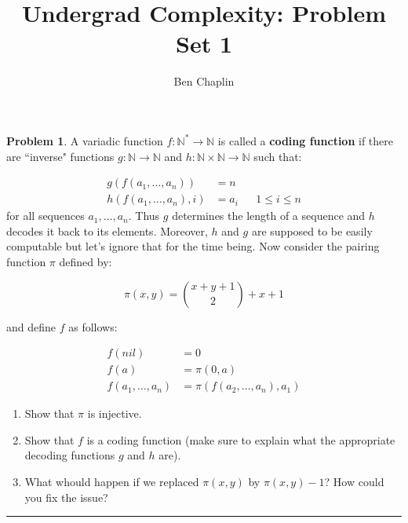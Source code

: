 \documentclass[11pt]{article}
\title{Undergrad Complexity: Problem Set 1}
\author{Ben Chaplin}
\date{}
\theoremstyle{plain}
\theoremstyle{definition}
\newtheorem{prob}{Problem}
\newcommand{\N}{\mathbb{N}}
\begin{document}
\maketitle

\begin{prob}
	A variadic function $f: \N^* \rightarrow \N$ is called a {\bf coding function} if there are ``inverse" functions
	$g: \N \rightarrow \N$ and $h: \N \times \N \rightarrow \N$ such that:

	\begin{align*}
		g(f(a_1, \ldots, a_n))    & = n                    \\
        h(f(a_1, \ldots, a_n), i) & = a_i && 1 \leq i \leq n
	\end{align*}
	for all sequences $a_1, \ldots, a_n$. Thus $g$ determines the length of a sequence and $h$ decodes it back to its elements.
	Moreover, $h$ and $g$ are supposed to be easily computable but let's ignore that for the time being. Now consider the pairing
	function $\pi$ defined by:

	$$\pi(x, y) = \binom{x + y + 1}{2} + x + 1$$

	and define $f$ as follows:

	\begin{align*}
		f(nil)              & = 0                             \\
		f(a)                & = \pi(0, a)                     \\
		f(a_1, \ldots, a_n) & = \pi(f(a_2, \ldots, a_n), a_1)
	\end{align*}

	\begin{enumerate}
		\item Show that $\pi$ is injective.
		\item Show that $f$ is a coding function (make sure to explain what the appropriate decoding functions $g$ and $h$ are).
		\item What whould happen if we replaced $\pi(x, y)$ by $\pi(x, y) -1$? How could you fix the issue?
	\end{enumerate}
\end{prob}

\noindent\rule{\textwidth}{0.5pt}
\end{document}
